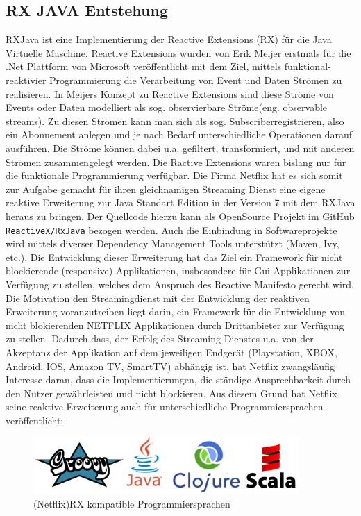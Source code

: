 \documentclass[12pt,oneside,a4paper,bibtotoc,liststotoc]{scrreprt}
\begin{document}
\subsection{RX JAVA Entstehung}
RXJava ist eine Implementierung der Reactive Extensions (RX) für die Java Virtuelle Maschine. Reactive Extensions wurden von Erik Meijer erstmals für die .Net Plattform von Microsoft veröffentlicht mit dem Ziel, mittels funktional-reaktivier Programmierung die Verarbeitung von Event und Daten Strömen zu realisieren. In Meijers Konzept zu Reactive Extensions sind diese Ströme von Events oder Daten modelliert als sog. \glqq observierbare Ströme\grqq (eng. observable streams). Zu diesen Strömen kann man sich als sog. \glqq Subscriber\grqq registrieren, also ein Abonnement anlegen und je nach Bedarf unterschiedliche Operationen darauf ausführen. Die Ströme können dabei u.a. gefiltert, transformiert, und mit anderen Strömen zusammengelegt werden. Die Ractive Extensions waren bislang nur für die funktionale Programmierung verfügbar. Die Firma Netflix hat es sich somit zur Aufgabe gemacht für ihren gleichnamigen Streaming Dienst eine eigene reaktive Erweiterung zur Java Standart Edition in der Version 7 mit dem RXJava heraus zu bringen. Der Quellcode hierzu kann als OpenSource Projekt im GitHub \texttt{ReactiveX/RxJava} bezogen werden. Auch die Einbindung in Softwareprojekte wird mittels diverser Dependency Management Tools unterstützt (Maven, Ivy, etc.). Die Entwicklung dieser Erweiterung hat das Ziel ein Framework für nicht blockierende (responsive) Applikationen, insbesondere für Gui Applikationen zur Verfügung zu stellen, welches dem Anspruch des Reactive Manifesto gerecht wird. Die Motivation den Streamingdienst mit der Entwicklung der reaktiven Erweiterung voranzutreiben liegt darin, ein Framework für die Entwicklung von nicht blokierenden NETFLIX Applikationen durch Drittanbieter zur Verfügung zu stellen. Dadurch dass, der Erfolg des Streaming Dienstes u.a. von der Akzeptanz der Applikation auf dem jeweiligen Endgerät (Playstation, XBOX, Android, IOS, Amazon TV, SmartTV) abhängig ist, hat Netflix zwangsläufig Interesse daran, dass die Implementierungen, die ständige Ansprechbarkeit durch den Nutzer gewährleisten und nicht blockieren. Aus diesem Grund hat Netflix seine reaktive Erweiterung auch für unterschiedliche Programmiersprachen veröffentlicht:
\begin{figure}[H]
  \begin{centering}
    \includegraphics[width=0.9\textwidth]{img/rx-languages.png}
    \caption{(Netflix)RX kompatible Programmiersprachen}
    \label{rx-languages}
  \end{centering}
\end{figure} 
\end{document}
